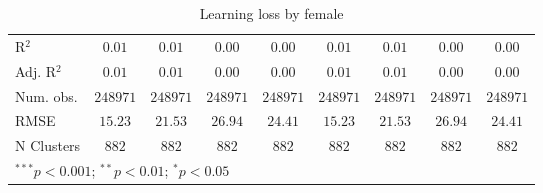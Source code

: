 \begin{table}
\begin{center}
\begin{tabular}{l c c c c c c c c}
\hline
R$^2$                     & $0.01$        & $0.01$        & $0.00$        & $0.00$        & $0.01$        & $0.01$        & $0.00$        & $0.00$        \\
Adj. R$^2$                & $0.01$        & $0.01$        & $0.00$        & $0.00$        & $0.01$        & $0.01$        & $0.00$        & $0.00$        \\
Num. obs.                 & $248971$      & $248971$      & $248971$      & $248971$      & $248971$      & $248971$      & $248971$      & $248971$      \\
RMSE                      & $15.23$       & $21.53$       & $26.94$       & $24.41$       & $15.23$       & $21.53$       & $26.94$       & $24.41$       \\
N Clusters                & $882$         & $882$         & $882$         & $882$         & $882$         & $882$         & $882$         & $882$         \\
\hline
\multicolumn{9}{l}{\scriptsize{$^{***}p<0.001$; $^{**}p<0.01$; $^{*}p<0.05$}}
\end{tabular}
\caption{Learning loss by female}
\label{table:female_match}
\end{center}
\end{table}
